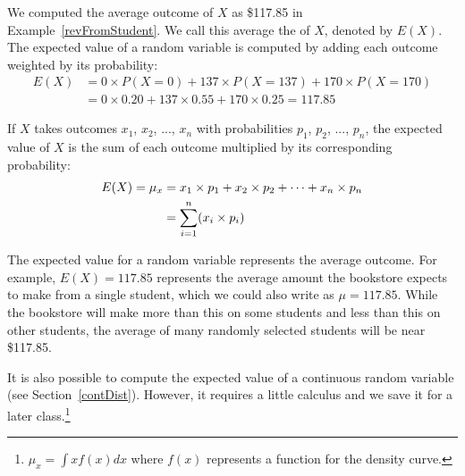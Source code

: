 We computed the average outcome of $X$ as \$117.85 in Example~\ref{revFromStudent}. We call this average the  of $X$, denoted by $E(X)$. The expected value of a random variable is computed by adding each outcome weighted by its probability:
\begin{align*}
E(X) &= 0 \times  P(X=0) + 137 \times  P(X=137) + 170 \times  P(X=170) \\
	&= 0 \times  0.20 + 137 \times  0.55 + 170 \times  0.25 = 117.85
\end{align*}

\begin{termBox}{
If $X$ takes outcomes $x_1$, $x_2$, ..., $x_n$ with probabilities $p_1$, $p_2$, ..., $p_n$, the expected value of $X$ is the sum of each outcome multiplied by its corresponding probability:
\begin{align}
E(X) = \mu_x &= x_1\times p_1 + x_2\times p_2 + \cdots + x_n\times p_n \notag \\
	&= \sum_{i=1}^{n}(x_i\times p_i)
\end{align}
}
\end{termBox}

The expected value for a random variable represents the average outcome. For example, $E(X)=117.85$ represents the average amount the bookstore expects to make from a single student, which we could also write as $\mu=117.85$. While the bookstore will make more than this on some students and less than this on other students, the average of many randomly selected students will be near \$117.85.

It is also possible to compute the expected value of a continuous random variable (see Section~\ref{contDist}). However, it requires a little calculus and we save it for a later class.\footnote{$\mu_x = \int xf(x)dx$ where $f(x)$ represents a function for the density curve.}


